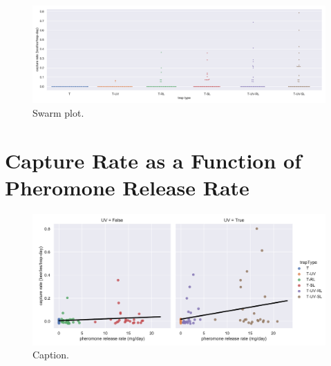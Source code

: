 \documentclass[12pt,letterpaper,english,bibliography=totocnumbered, abstract=on]{scrartcl}
\begin{document}
\begin{figure}[h]
\centering
\includegraphics[width=1\linewidth]{images/trapcatch-swarmplot}
\caption{Swarm plot.}
\label{fig:trapcatch-swarmplot}
\end{figure}

\newpage

\section{Capture Rate as a Function of Pheromone Release Rate}

\begin{figure}[h]
\centering
\includegraphics[width=1\linewidth]{images/trapcatch-lmplot}
\caption{Caption.}
\label{fig:trapcatch-lmplot}
\end{figure}

\printbibliography	
\end{document}
